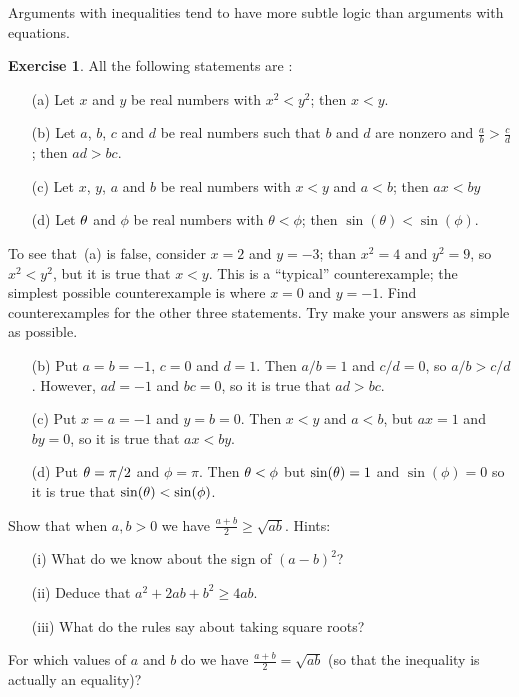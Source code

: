 \documentclass[a4paper]{book}
\theoremstyle{definition}
\newtheorem{exercise}[theorem]{Exercise}
\newenvironment{starex}{
 \renewcommand{\thetheorem}{\arabic{chapter}.\arabic{section}.\arabic{theorem}${}^*$}
 \exercise
}{\endexercise}
\renewenvironment{solution}{\SolutionInline}{\endSolutionInline}
\begin{document}
Arguments with inequalities tend to have more subtle logic than
arguments with equations.  
\begin{exercise}
 All the following statements are :
 \begin{itemize}
  \item[(a)] Let $x$ and $y$ be real numbers with $x^2<y^2$; then
   $x<y$. 
  \item[(b)] Let $a$, $b$, $c$ and $d$ be real numbers such that $b$
   and $d$ are nonzero and $\frac{a}{b}>\frac{c}{d}$; then $ad>bc$.
  \item[(c)] Let $x$, $y$, $a$ and $b$ be real numbers with $x<y$ and
   $a<b$; then $ax<by$ 
  \item[(d)] Let $\theta$ and $\phi$ be real numbers with $\theta<\phi$;
   then $\sin(\theta)<\sin(\phi)$.
 \end{itemize}
 To see that~(a) is false, consider $x=2$ and $y=-3$; than $x^2=4$ and
 $y^2=9$, so $x^2<y^2$, but it is  true that $x<y$.  This is
 a ``typical'' counterexample; the simplest possible counterexample is
 where $x=0$ and $y=-1$.  Find counterexamples for the other three
 statements.  Try make your answers as simple as possible.
\end{exercise}
\begin{solution}
 \begin{itemize}
  \item[(b)] Put $a=b=-1$, $c=0$ and $d=1$.  Then $a/b=1$ and $c/d=0$,
   so $a/b>c/d$.  However, $ad=-1$ and $bc=0$, so it is 
   true that $ad>bc$.
  \item[(c)] Put $x=a=-1$ and $y=b=0$.  Then $x<y$ and $a<b$, but
   $ax=1$ and $by=0$, so it is  true that $ax<by$.
  \item[(d)] Put $\theta=\pi/2$ and $\phi=\pi$. Then $\theta<\phi$ but
   $\sin(\theta)=1$ and $\sin(\phi)=0$ so it is  true that
   $\sin(\theta)<\sin(\phi)$.  
 \end{itemize}
\end{solution}
\begin{starex}
 Show that when $a,b>0$ we have $\frac{a+b}{2}\geq\sqrt{ab}$.
 Hints:
 \begin{itemize}
  \item[(i)] What do we know about the sign of $(a-b)^2$?
  \item[(ii)] Deduce that $a^2+2ab+b^2\geq 4ab$.
  \item[(iii)] What do the rules say about taking square roots? 
 \end{itemize}
 For which values of $a$ and $b$ do we have $\frac{a+b}{2}=\sqrt{ab}$
 (so that the inequality is actually an equality)?
\end{starex}
\end{document}
